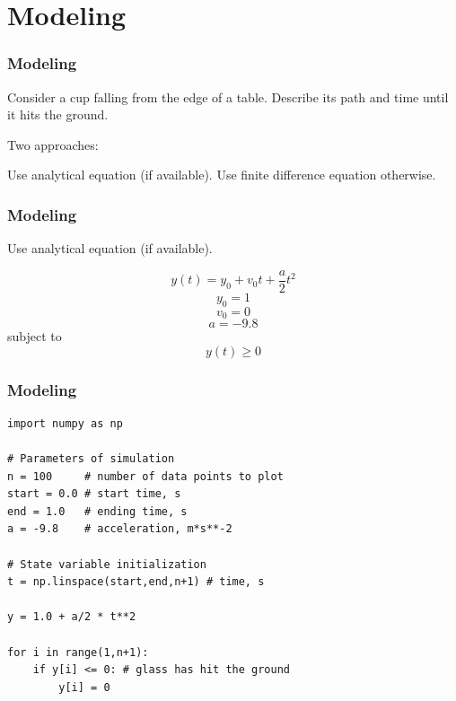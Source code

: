 \documentclass[11pt]{beamer}
\begin{document}

\section{Modeling}

\begin{frame}[fragile]
  \frametitle{Modeling}
  \Enlarge

  Consider a cup falling from the edge of a table.  Describe its path and time until it hits the ground. %

  Two approaches:
  \begin{enumerate}
  \myitem  Use analytical equation (if available).
  \myitem  Use finite difference equation otherwise.
  \end{enumerate}
\end{frame}

\begin{frame}[fragile]
  \frametitle{Modeling}
  \Enlarge

  \begin{enumerate}
  \myitem  Use analytical equation (if available).
  \end{enumerate}

$$
y(t) = y_0 + v_0 t + \frac{a}{2} t^{2}
$$
$$
y_0 = 1
$$
$$
v_0 = 0
$$
$$
a = -9.8
$$
subject to
$$
y(t) \geq 0
$$
\end{frame}

\begin{frame}[fragile]
  \frametitle{Modeling}

  \begin{Verbatim}
import numpy as np

# Parameters of simulation
n = 100     # number of data points to plot
start = 0.0 # start time, s
end = 1.0   # ending time, s
a = -9.8    # acceleration, m*s**-2

# State variable initialization
t = np.linspace(start,end,n+1) # time, s

y = 1.0 + a/2 * t**2

for i in range(1,n+1):
    if y[i] <= 0: # glass has hit the ground
        y[i] = 0
  \end{Verbatim}
\end{frame}
\end{document}
